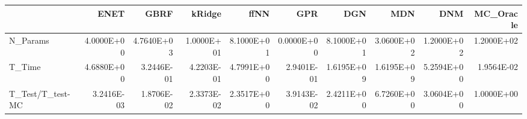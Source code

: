\begin{tabular}{lrrrrrrrrr}
\toprule
{} &       ENET &       GBRF &     kRidge &       ffNN &        GPR &        DGN &        MDN &        DNM &  MC\_Oracle \\
\midrule
N\_Params         & 4.0000E+00 & 4.7640E+03 & 1.0000E+01 & 8.1000E+01 & 0.0000E+00 & 8.1000E+01 & 3.0600E+02 & 1.2000E+02 & 1.2000E+02 \\
T\_Time           & 4.6880E+00 & 3.2446E-01 & 4.2203E-01 & 4.7991E+00 & 2.9401E-01 & 1.6195E+09 & 1.6195E+09 & 5.2594E+00 & 1.9564E-02 \\
T\_Test/T\_test-MC & 3.2416E-03 & 1.8706E-02 & 2.3373E-02 & 2.3517E+00 & 3.9143E-02 & 2.4211E+00 & 6.7260E+00 & 3.0604E+00 & 1.0000E+00 \\
\bottomrule
\end{tabular}
